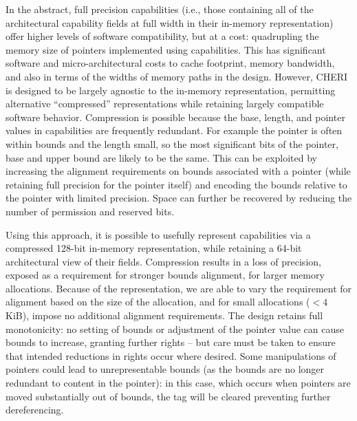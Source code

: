 In the abstract, full precision capabilities (i.e., those containing all of
the architectural capability fields at full width in their in-memory
representation) offer higher levels of software compatibility, but at a cost:
quadrupling the memory size of pointers implemented using capabilities.
This has significant software and micro-architectural costs to cache
footprint, memory bandwidth, and also in terms of the widths of memory paths
in the design.
However, CHERI is designed to be largely agnostic to the in-memory
representation, permitting alternative ``compressed'' representations while
retaining largely compatible software behavior.
Compression is possible because the base, length, and pointer values in
capabilities are frequently redundant. For example the pointer is often
within bounds and the length small, so the most significant bits of the pointer,
base and upper bound are likely to be the same.
This can be exploited by increasing
the alignment requirements on bounds associated with a pointer (while
retaining full precision for the pointer itself) and encoding the bounds relative
to the pointer with limited precision.
Space can further be recovered by reducing the number of permission and reserved bits.

Using this approach, it is possible to usefully represent capabilities via a
compressed 128-bit in-memory representation, while retaining a 64-bit
architectural view of their fields.
Compression results in a loss of precision, exposed as a requirement for stronger
bounds alignment, for larger memory allocations.
Because of the representation, we are able to vary the
requirement for alignment based on the size of the allocation, and for small
allocations ($< 4$ KiB), impose no additional alignment requirements.
The design retains full monotonicity: no setting of bounds or adjustment of
the pointer value can cause bounds to increase, granting further rights -- but
care must be taken to ensure that intended reductions in rights occur where
desired.
Some manipulations of pointers could lead to unrepresentable bounds (as the
bounds are no longer redundant to content in the pointer): in this case, which
occurs when pointers are moved substantially out of bounds, the tag will be
cleared preventing further dereferencing.

